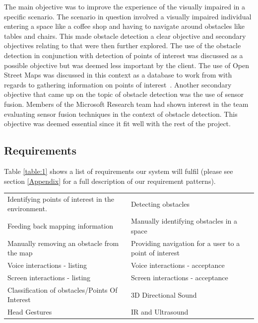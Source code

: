 \documentclass[prodmode,acmtosem]{acmsmall} %
\begin{document}
The main objective was to improve the experience of the visually impaired in a specific scenario. The scenario in question involved a visually impaired individual entering a space like a coffee shop and having to navigate around obstacles like tables and chairs.
This made obstacle detection a clear objective and secondary objectives relating to that were then further explored. The use of the obstacle detection in conjunction with detection of points of interest was discussed as a possible objective but was deemed less important by the client.
The use of Open Street Maps was discussed in this context as a database to work from with regards to gathering information on points of interest~\cite{OSM}.
Another secondary objective that came up on the topic of obstacle detection was the use of sensor fusion. Members of the Microsoft Research team had shown interest in the team evaluating sensor fusion techniques in the context of obstacle detection. This objective was deemed essential since it fit well with the rest of the project.



\subsection{Requirements}

Table \ref{table:1} shows a list of requirements our system will fulfil (please see section \ref{Appendix} for a full description of our requirement patterns).\\

\renewcommand{\arraystretch}{1.5}

\begin{center}
\begin{tabularx}{\textwidth}{| X | X |} 
 \hline
 \rowcolor{lightgray}
 \multicolumn{2}{|c|}{List of Requirements} \\ [0.5ex] 
 \hline\hline
 Identifying points of interest in the environment. &  Detecting obstacles \\
 \hline
 Feeding back mapping information &  Manually identifying obstacles in a space \\
 \hline
 Manually removing an obstacle from the map &  Providing navigation for a user to a point of interest \\ 
 \hline
 Voice interactions - listing &  Voice interactions - acceptance \\ 
 \hline
 Screen interactions - listing &  Screen interactions - acceptance \\ 
 \hline
 Classification of obstacles/Points Of Interest &  3D Directional Sound \\ 
 \hline
 Head Gestures &  IR and Ultrasound \\  
 \hline

 \hline
\end{tabularx}
\label{tab:requirements}
\end{center}
\end{document}
